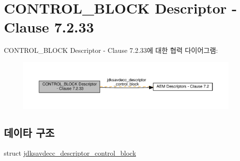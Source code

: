\hypertarget{group__descriptor__control__block}{}\section{C\+O\+N\+T\+R\+O\+L\+\_\+\+B\+L\+O\+CK Descriptor -\/ Clause 7.2.33}
\label{group__descriptor__control__block}
C\+O\+N\+T\+R\+O\+L\+\_\+\+B\+L\+O\+CK Descriptor -\/ Clause 7.2.33에 대한 협력 다이어그램\+:
\nopagebreak
\begin{figure}[H]
\begin{center}
\leavevmode
\includegraphics[width=350pt]{group__descriptor__control__block}
\end{center}
\end{figure}
\subsection*{데이타 구조}
\begin{DoxyCompactItemize}
\item 
struct \hyperlink{structjdksavdecc__descriptor__control__block}{jdksavdecc\+\_\+descriptor\+\_\+control\+\_\+block}
\end{DoxyCompactItemize}
